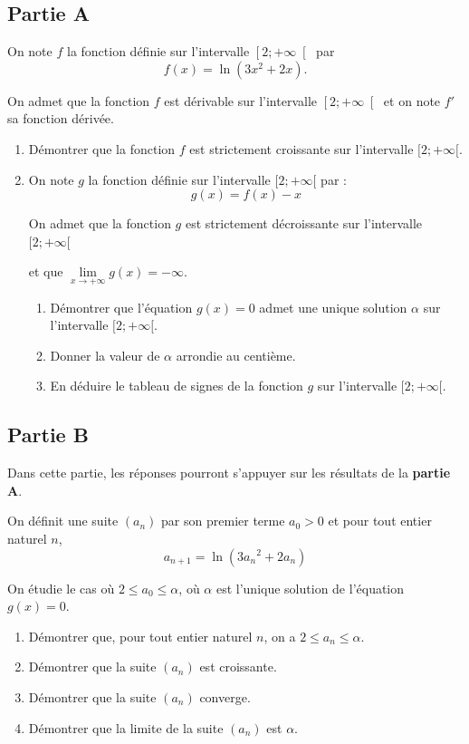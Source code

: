 \subsection*{Partie A}
On note $f$ la fonction définie sur l'intervalle $\left[2 ;+\infty\right[$ par \[f(x)=\ln \left(3 x^{2}+2 x\right).\]

On admet que la fonction $f$ est dérivable sur l'intervalle $\left[2 ; +\infty \right[$ et on note $f'$ sa fonction dérivée.

\begin{enumerate}
	\item Démontrer que la fonction $f$ est strictement croissante sur l'intervalle $[2 ;+\infty[$.

	\item On note $g$ la fonction définie sur l'intervalle $[2 ;+\infty[$ par :
	\[g(x)=f(x)-x\]

	On admet que la fonction $g$ est strictement décroissante sur l'intervalle $[2 ;+\infty[$

	et que $\lim\limits_{x \to +\infty} g(x)=-\infty$.

	\begin{enumerate}
		\item Démontrer que l'équation $g(x)=0$ admet une unique solution $\alpha$ sur l'intervalle $[2 ;+\infty[$.

		\item Donner la valeur de $\alpha$ arrondie au centième.

		\item En déduire le tableau de signes de la fonction $g$ sur l'intervalle $[2 ;+\infty[$.
	\end{enumerate}
\end{enumerate}

\subsection*{Partie B}
Dans cette partie, les réponses pourront s'appuyer sur les résultats de la \textbf{partie A}.

On définit une suite $(a_{n})$ par son premier terme $a_{0}>0$ et pour tout entier naturel $n$,
\[a_{n+1}=\ln \left(3 {a_{n}}^{2}+2 a_{n}\right)\]

On étudie le cas où \quad $2 \leqslant a_{0} \leqslant \alpha$, \quad où $\alpha$ est l'unique solution de l'équation $g(x)=0$.

\begin{enumerate}
	\item Démontrer que, pour tout entier naturel $n$, on a $2 \leqslant a_{n} \leqslant \alpha$.

	\item Démontrer que la suite $(a_{n})$ est croissante.

	\item Démontrer que la suite $(a_{n})$ converge.

	\item Démontrer que la limite de la suite $(a_{n})$ est $\alpha$.
\end{enumerate}

